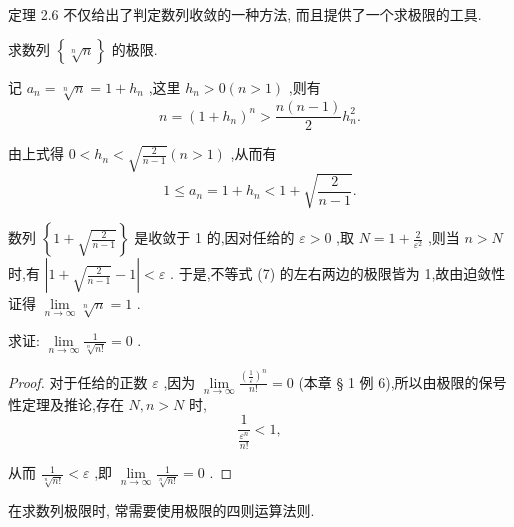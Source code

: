 定理 2.6 不仅给出了判定数列收敛的一种方法, 而且提供了一个求极限的工具.

\begin{example}
求数列 \(\left\{  \sqrt[n]{n}\right\}\) 的极限.
\end{example}


\begin{solution}
记 \({a}_{n} = \sqrt[n]{n} = 1 + {h}_{n}\) ,这里 \({h}_{n} > 0\left( {n > 1}\right)\) ,则有
\[
n = {\left( 1 + {h}_{n}\right) }^{n} > \frac{n\left( {n - 1}\right) }{2}{h}_{n}^{2}.
\]

由上式得 \(0 < {h}_{n} < \sqrt{\frac{2}{n - 1}}\left( {n > 1}\right)\) ,从而有
\[
1 \leq  {a}_{n} = 1 + {h}_{n} < 1 + \sqrt{\frac{2}{n - 1}}. \tag{7}
\]

数列 \(\left\{  {1 + \sqrt{\frac{2}{n - 1}}}\right\}\) 是收敛于 1 的,因对任给的 \(\varepsilon  > 0\) ,取 \(N = 1 + \frac{2}{{\varepsilon }^{2}}\) ,则当 \(n > N\) 时,有 \(\left| {1 + \sqrt{\frac{2}{n - 1}} - 1}\right|  < \varepsilon\) . 于是,不等式 (7) 的左右两边的极限皆为 1,故由迫敛性证得 \(\mathop{\lim }\limits_{{n \rightarrow  \infty }}\sqrt[n]{n} = 1\) .
\end{solution}


\begin{example}
求证: \(\mathop{\lim }\limits_{{n \rightarrow  \infty }}\frac{1}{\sqrt[n]{n!}} = 0\) .
\end{example}


\begin{proof}
对于任给的正数 \(\varepsilon\) ,因为 \(\mathop{\lim }\limits_{{n \rightarrow  \infty }}\frac{{\left( \frac{1}{\varepsilon }\right) }^{n}}{n!} = 0\) (本章 § 1 例 6),所以由极限的保号性定理及推论,存在 \(N,n > N\) 时,
\[
\frac{1}{\frac{{\varepsilon }^{n}}{n!}} < 1,
\]

从而 \(\frac{1}{\sqrt[n]{n!}} < \varepsilon\) ,即 \(\mathop{\lim }\limits_{{n \rightarrow  \infty }}\frac{1}{\sqrt[n]{n!}} = 0\) .

\end{proof}


在求数列极限时, 常需要使用极限的四则运算法则.

